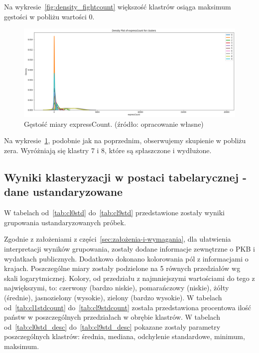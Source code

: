 \documentclass[11pt]{report}
\begin{document}
    Na wykresie~\ref{fig:density_fightcount} większość klastrów osiąga maksimum gęstości w pobliżu wartości 0.

    \begin{figure}[!htp]
        \centering
        \includegraphics[width=\linewidth]{fig/CLUST/density_expressCount.png}
        \caption{Gęstość miary expressCount. (źródło: opracowanie własne)}
        \label{fig:density_expresscount}
    \end{figure}

    Na wykresie~\ref{fig:density_expresscount}, podobnie jak na poprzednim, obserwujemy skupienie w pobliżu zera.
    Wyróżniają się klastry 7 i 8, które są spłaszczone i wydłużone.

    \subsection{Wyniki klasteryzacji w postaci tabelarycznej - dane ustandaryzowane}
    W tabelach od~\ref{tab:cl0std} do~\ref{tab:cl9std} przedstawione zostały wyniki grupowania ustandaryzowanych próbek.

    Zgodnie z założeniami z części~\ref{sec:założenia-i-wymagania}, dla ułatwienia interpretacji wyników grupowania, zostały dodane informacje zewnętrzne o PKB i wydatkach publicznych.
    Dodatkowo dokonano kolorowania pól z informacjami o krajach.
    Poszczególne miary zostały podzielone na 5 równych przedziałów wg skali logarytmicznej.
    Kolory, od przedziału z najmniejszymi wartościami do tego z największymi, to: czerwony (bardzo niskie), pomarańczowy (niskie), żółty (średnie), jasnozielony (wysokie), zielony (bardzo wysokie).
    W tabelach od~\ref{tab:cl1stdcount} do~\ref{tab:cl9stdcount} została przedstawiona procentowa ilość państw w poszczególnych przedziałach w obrębie klastrów.
    W tabelach od~\ref{tab:cl0std_desc} do~\ref{tab:cl9std_desc} pokazane zostały parametry poszczególnych klastrów: średnia, mediana, odchylenie standardowe, minimum, maksimum.
\end{document}
